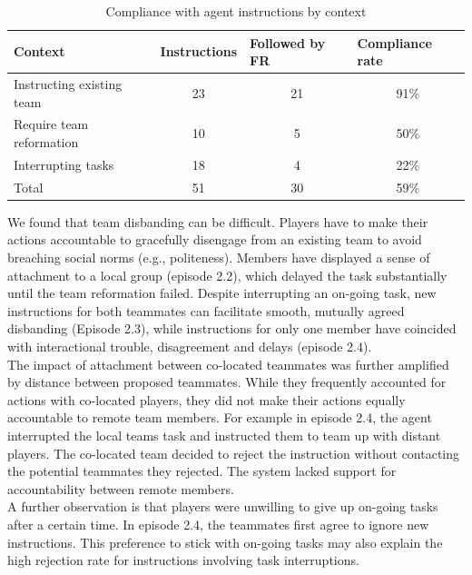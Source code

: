 \begin{table}[h]
\footnotesize
\begin{tabular}{l|ccc}
Context                   & \multicolumn{1}{l}{Instructions} & \multicolumn{1}{l}{Followed by FR} & \multicolumn{1}{l}{Compliance rate} \\ \hline
Instructing existing team & 23                               & 21                                 & 91\%                                \\
Require team reformation  & 10                               & 5                                  & 50\%                                \\
Interrupting tasks        & 18                               & 4                                  & 22\%                                \\
Total                     & 51                               & 30                                 & 59\%                               
\end{tabular}
\caption{Compliance with agent instructions by context}
\label{tab:compliancerate}
\end{table}

We found that team disbanding can be difficult. Players have to make their actions accountable to gracefully disengage from an existing team to avoid breaching social norms (e.g., politeness). Members have displayed a sense of attachment to a local group (episode 2.2), which delayed the task substantially until the team reformation failed. Despite interrupting an on-going task, new instructions for both teammates can facilitate smooth, mutually agreed disbanding (Episode 2.3), while instructions for only one member have coincided with interactional trouble, disagreement and delays (episode 2.4). \\

The impact of attachment between co-located teammates was further amplified by distance between proposed teammates. While they frequently accounted for actions with co-located players, they did not make their actions equally accountable to remote team members. For example in episode 2.4, the agent interrupted the local teams task and instructed them to team up with distant players. The co-located team decided to reject the instruction without contacting the potential teammates they rejected. The system lacked support for accountability between remote members. \\

A further observation is that players were unwilling to give up on-going tasks after a certain time. In episode 2.4, the teammates first agree to ignore new instructions. This preference to stick with on-going tasks may also explain the high rejection rate for instructions involving task interruptions. \\


